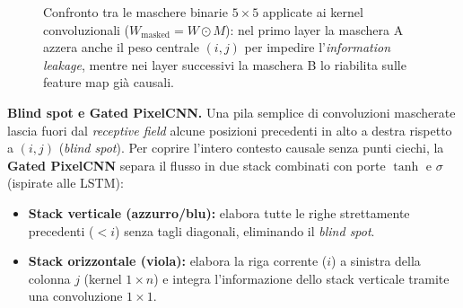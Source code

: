 \documentclass[11pt,a4paper]{article}
\begin{document}
\begin{figure}[H]
\begin{tikzpicture}
\end{tikzpicture}
\caption{Confronto tra le maschere binarie $5\times 5$ applicate ai kernel convoluzionali ($W_{\mathrm{masked}} = W \odot M$): nel primo layer la maschera A azzera anche il peso centrale $(i,j)$ per impedire l'\emph{information leakage}, mentre nei layer successivi la maschera B lo riabilita sulle feature map già causali.}
\end{figure}

\textbf{Blind spot e Gated PixelCNN.} Una pila semplice di convoluzioni mascherate lascia fuori dal \emph{receptive field} alcune posizioni precedenti in alto a destra rispetto a $(i,j)$ (\emph{blind spot}). Per coprire l'intero contesto causale senza punti ciechi, la \textbf{Gated PixelCNN} separa il flusso in due stack combinati con porte $\tanh$ e $\sigma$ (ispirate alle LSTM):
\begin{itemize}
  \item \textbf{Stack verticale (azzurro/blu):} elabora tutte le righe strettamente precedenti ($< i$) senza tagli diagonali, eliminando il \emph{blind spot}.
  \item \textbf{Stack orizzontale (viola):} elabora la riga corrente ($i$) a sinistra della colonna $j$ (kernel $1 \times n$) e integra l'informazione dello stack verticale tramite una convoluzione $1 \times 1$.
\end{itemize}
\end{document}
